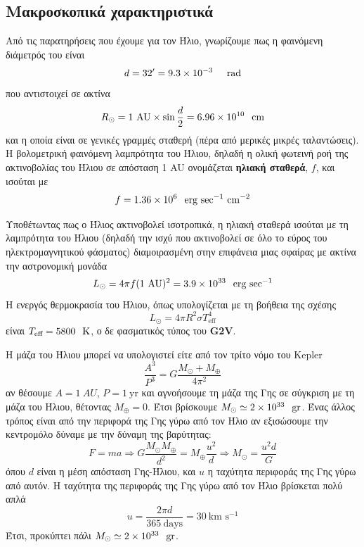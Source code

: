 \subsection{Μακροσκοπικά χαρακτηριστικά}
Από τις παρατηρήσεις που έχουμε για τον Ήλιο, γνωρίζουμε πως η φαινόμενη διάμετρός του είναι
$$d = 32^\prime = 9.3 \times 10^{-3} \hspace{0.5cm} \text{rad}$$ που αντιστοιχεί σε ακτίνα
$$R_{\odot} = 1 \ \text{AU} \times \sin{\frac{d}{2}} = 6.96 \times 10^{10} \hspace{0.25cm} \text{cm}$$ και η οποία είναι σε γενικές γραμμές σταθερή (πέρα από μερικές μικρές ταλαντώσεις). Η βολομετρική φαινόμενη λαμπρότητα του Ήλιου, δηλαδή η ολική φωτεινή ροή της ακτινοβολίας του Ήλιου σε απόσταση 1 AU ονομάζεται \textbf{ηλιακή σταθερά}, $f$, και ισούται με 
$$f=1.36 \times 10^6 \hspace{0.25cm} \text{erg sec$^{-1}$ cm$^{-2}$}$$

Υποθέτωντας πως ο Ήλιος ακτινοβολεί ισοτροπικά, η ηλιακή σταθερά ισούται με τη λαμπρότητα του Ήλιου (δηλαδή την ισχύ που ακτινοβολεί σε όλο το εύρος του ηλεκτρομαγνητικού φάσματος) διαμοιρασμένη στην επιφάνεια μιας σφαίρας με ακτίνα την αστρονομική μονάδα
$$L_{\odot} = 4\pi f (1 \ \text{AU})^2 = 3.9 \times 10^{33} \hspace{0.25cm} \text{erg sec$^{-1}$}$$
Η ενεργός θερμοκρασία του Ήλιου, όπως υπολογίζεται με τη βοήθεια της σχέσης
$$L_{\odot} = 4\pi R^2 \sigma T_{\text{eff}}^4$$ 
είναι $T_{\text{eff}} = 5800 \hspace{0.25cm} \text{K}$, ο δε φασματικός τύπος του \textbf{G2V}.

Η μάζα του Ήλιου μπορεί να υπολογιστεί είτε από τον τρίτο νόμο του Kepler 
$$\frac{A^3}{P^3} = G \frac{M_{\odot} + M_{\oplus}}{4 \pi ^2}$$ αν θέσουμε $A = 1 \ AU$, $P = 1 \ \text{yr}$ και αγνοήσουμε τη μάζα της Γης σε σύγκριση με τη μάζα του Ήλιου, θέτοντας $M_{\oplus} = 0$. Έτσι βρίσκουμε $M_{\odot} \simeq 2 \times 10^{33} \hspace{0.25cm} \text{gr}$. Ένας άλλος τρόπος είναι από την περιφορά της Γης γύρω από τον Ήλιο αν εξισώσουμε την κεντρομόλο δύναμε με την δύναμη της βαρύτητας:
$$F = ma \Rightarrow G \frac{M_\odot M_\oplus}{d^2} = M_\oplus \frac{u^2}{d} \Rightarrow M_{\odot} = \frac{u^2 d}{G}$$ όπου $d$ είναι η μέση απόσταση Γης-Ήλιου, και $u$ η ταχύτητα περιφοράς της Γης γύρω από αυτόν. Η ταχύτητα της περιφοράς της Γης γύρω από τον Ήλιο βρίσκεται πολύ απλά
$$u = \frac{2\pi d}{365 \ \text{days}} = 30 \ \text{km s$^{-1}$}$$
Έτσι, προκύπτει πάλι $M_{\odot} \simeq 2 \times 10^{33} \hspace{0.25cm} \text{gr}$.

